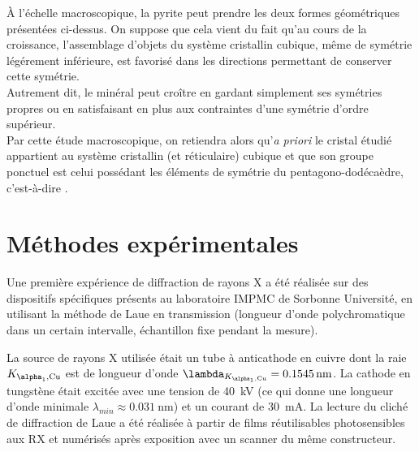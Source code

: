 À l'échelle macroscopique, la pyrite peut prendre les deux formes géométriques présentées ci-dessus. On suppose que cela vient du fait qu'au cours de la croissance, l'assemblage d'objets du système cristallin cubique, même de symétrie légérement inférieure, est favorisé dans les directions permettant de conserver cette symétrie.\\
Autrement dit, le minéral peut croître en gardant simplement ses symétries propres ou en satisfaisant en plus aux contraintes d'une symétrie d'ordre supérieur.\\
Par cette étude macroscopique, on retiendra alors qu'\textit{a priori} le cristal étudié appartient au système cristallin (et réticulaire) cubique et que son groupe ponctuel est celui possédant les éléments de symétrie du pentagono-dodécaèdre, c'est-à-dire .

\section{Méthodes expérimentales}

Une première expérience de diffraction de rayons X a été réalisée sur des dispositifs spécifiques présents au laboratoire IMPMC de Sorbonne Université, en utilisant la méthode de Laue en transmission (longueur d'onde polychromatique dans un certain intervalle, échantillon fixe pendant la mesure).

La source de rayons X utilisée était un tube à anticathode en cuivre dont la raie \(K_{\alpha_1,\ce{Cu}}\) est de longueur d'onde \(\lambda_{K_{\alpha_1,\ce{Cu}}}=\SI{0.1545}{\nano\metre}\). La cathode en tungstène était excitée avec une tension de \SI{40}{\kilo\volt} (ce qui donne une longueur d'onde minimale \(\lambda_{min} \approx \SI{0.031}{\nano\metre}\)) et un courant de \SI{30}{\milli\ampere}. La lecture du cliché de diffraction de Laue a été réalisée à partir de films réutilisables photosensibles aux RX et numérisés après exposition avec un scanner du même constructeur.

